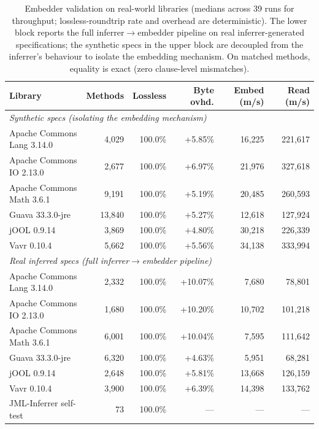 \begin{table}[ht]
\centering
\caption{Embedder validation on real-world libraries (medians across 39 runs for throughput; lossless-roundtrip rate and overhead are deterministic). The lower block reports the full inferrer$\to$embedder pipeline on real inferrer-generated specifications; the synthetic specs in the upper block are decoupled from the inferrer's behaviour to isolate the embedding mechanism. On matched methods, equality is exact (zero clause-level mismatches).}
\label{tab:validation}
\begin{tabular}{lrrrrr}
\toprule
\textbf{Library} & \textbf{Methods} & \textbf{Lossless} & \textbf{Byte ovhd.} & \textbf{Embed (m/s)} & \textbf{Read (m/s)} \\
\midrule
\multicolumn{6}{l}{\textit{Synthetic specs (isolating the embedding mechanism)}} \\
Apache Commons Lang 3.14.0  & 4{,}029  & 100.0\% & +5.85\% & 16{,}225 & 221{,}617 \\
Apache Commons IO 2.13.0    & 2{,}677  & 100.0\% & +6.97\% & 21{,}976 & 327{,}618 \\
Apache Commons Math 3.6.1   & 9{,}191  & 100.0\% & +5.19\% & 20{,}485 & 260{,}593 \\
Guava 33.3.0-jre            & 13{,}840 & 100.0\% & +5.27\% & 12{,}618 & 127{,}924 \\
jOOL 0.9.14                 & 3{,}869  & 100.0\% & +4.80\% & 30{,}218 & 226{,}339 \\
Vavr 0.10.4                 & 5{,}662  & 100.0\% & +5.56\% & 34{,}138 & 333{,}994 \\
\midrule
\multicolumn{6}{l}{\textit{Real inferred specs (full inferrer$\to$embedder pipeline)}} \\
Apache Commons Lang 3.14.0  & 2{,}332  & 100.0\% & +10.07\% & 7{,}680  & 78{,}801 \\
Apache Commons IO 2.13.0    & 1{,}680  & 100.0\% & +10.20\% & 10{,}702 & 101{,}218 \\
Apache Commons Math 3.6.1   & 6{,}001  & 100.0\% & +10.04\% & 7{,}595  & 111{,}642 \\
Guava 33.3.0-jre            & 6{,}320  & 100.0\% & +4.63\%  & 5{,}951  & 68{,}281 \\
jOOL 0.9.14                 & 2{,}648  & 100.0\% & +5.81\%  & 13{,}668 & 126{,}159 \\
Vavr 0.10.4                 & 3{,}900  & 100.0\% & +6.39\%  & 14{,}398 & 133{,}762 \\
JML-Inferrer self-test      & 73       & 100.0\% & ---      & ---      & --- \\
\bottomrule
\end{tabular}
\end{table}

